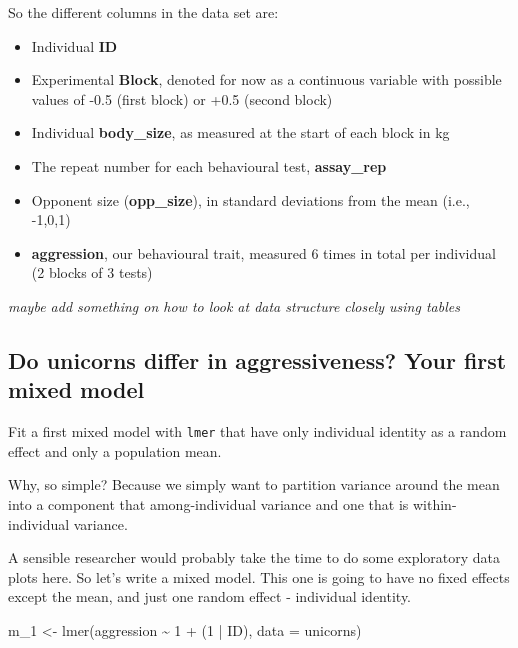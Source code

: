 \documentclass[
  12pt,
]{book}
\newenvironment{Shaded}{\begin{snugshade}}{\end{snugshade}}
\newcommand{\AttributeTok}[1]{\textcolor[rgb]{0.77,0.63,0.00}{#1}}
\newcommand{\DecValTok}[1]{\textcolor[rgb]{0.00,0.00,0.81}{#1}}
\newcommand{\FunctionTok}[1]{\textcolor[rgb]{0.00,0.00,0.00}{#1}}
\newcommand{\NormalTok}[1]{#1}
\newcommand{\OtherTok}[1]{\textcolor[rgb]{0.56,0.35,0.01}{#1}}
\newcommand{\SpecialCharTok}[1]{\textcolor[rgb]{0.00,0.00,0.00}{#1}}
\providecommand{\tightlist}{%
  \setlength{\itemsep}{0pt}\setlength{\parskip}{0pt}}
\begin{document}
So the different columns in the data set are:

\begin{itemize}
\tightlist
\item
  Individual \textbf{ID}
\item
  Experimental \textbf{Block}, denoted for now as a continuous variable with possible values of -0.5 (first block) or +0.5 (second block)
\item
  Individual \textbf{body\_size}, as measured at the start of each block in kg
\item
  The repeat number for each behavioural test, \textbf{assay\_rep}
\item
  Opponent size (\textbf{opp\_size}), in standard deviations from the mean (i.e., -1,0,1)
\item
  \textbf{aggression}, our behavioural trait, measured 6 times in total per individual (2 blocks of 3 tests)
\end{itemize}

\emph{maybe add something on how to look at data structure closely using tables}

\hypertarget{do-unicorns-differ-in-aggressiveness-your-first-mixed-model}{%
\subsection{Do unicorns differ in aggressiveness? Your first mixed model}\label{do-unicorns-differ-in-aggressiveness-your-first-mixed-model}}

Fit a first mixed model with \texttt{lmer} that have only individual identity as a random effect and only a population mean.

Why, so simple? Because we simply want to partition variance around the mean into a component that among-individual variance and one that is within-individual variance.

A sensible researcher would probably take the time to do some exploratory data plots here. So let's write a mixed model. This one is going to have no fixed effects except the mean, and just one random effect - individual identity.

\begin{Shaded}
\begin{Highlighting}[]
\NormalTok{m\_1 }\OtherTok{\textless{}{-}} \FunctionTok{lmer}\NormalTok{(aggression }\SpecialCharTok{\textasciitilde{}} \DecValTok{1} \SpecialCharTok{+}\NormalTok{  (}\DecValTok{1} \SpecialCharTok{|}\NormalTok{ ID), }\AttributeTok{data =}\NormalTok{ unicorns)}
\end{Highlighting}
\end{Shaded}
\end{document}
